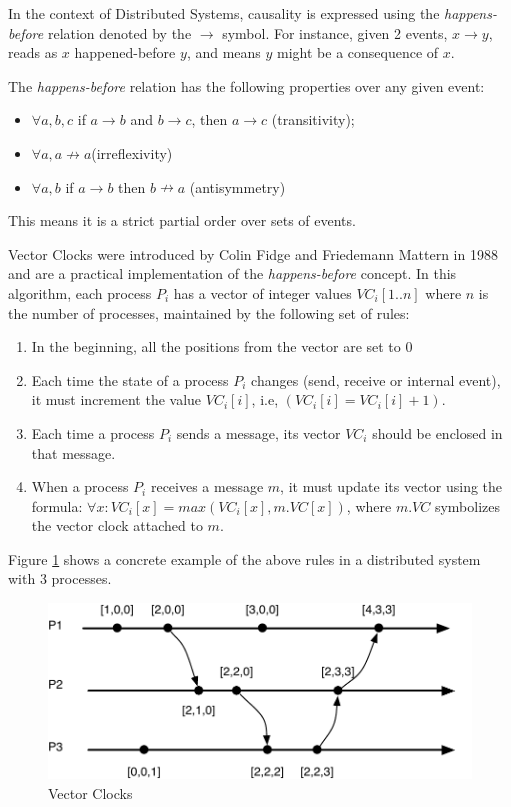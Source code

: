 In the context of Distributed Systems, causality is expressed using the
\textit{happens-before} relation \cite{Lamport:1978} denoted by the
$\rightarrow$ symbol. For instance, given 2 events, $x \rightarrow y$, reads
as $x$ happened-before $y$, and means $y$ might be a consequence of
$x$.

The \textit{happens-before} relation has the following properties over any given event:
\begin{itemize}
\item $\forall a,b,c$ if $a \rightarrow b$ and $b\rightarrow c$, then $a
  \rightarrow c$ (transitivity);
\item $\forall a, a \nrightarrow a$(irreflexivity)
\item $\forall a,b$ if $a \rightarrow b$ then $b \nrightarrow a$ (antisymmetry)
\end{itemize}

This means it is a  strict partial order over
sets of events.

Vector Clocks were introduced by Colin Fidge \cite{Fidge} and Friedemann Mattern
\cite{Mattern} in 1988 and are a practical implementation of the
\textit{happens-before} concept.
In this algorithm, each process $P_i$ has a vector of integer values
$VC_i[1..n]$ where $n$ is the number of processes, maintained by the following
set of rules:
\begin{enumerate}
\item In the beginning, all the positions from the vector are set to 0
\item Each time the state of a process $P_i$ changes (send, receive or
  internal event), it must increment
  the value $VC_i[i]$, i.e, $(VC_i[i] = VC_i[i]+1)$.
\item Each time a process $P_i$ sends a message, its vector $VC_i$
  should be enclosed in that message.
\item When a process $P_i$ receives a message $m$, it must update its
  vector using the formula: $\forall x:VC_i[x] = max(VC_i[x],m.VC[x])$,
  where $m.VC$ symbolizes the vector clock attached to $m$.
\end{enumerate}

Figure \ref{fig:vector_clocks} shows a concrete example of the above
rules in a distributed system with 3 processes.

\begin{figure}[htb]
  \centering
  \includegraphics[width=\textwidth]{images/vector_clocks.pdf}
  \caption{ Vector Clocks}
  \label{fig:vector_clocks}
\end{figure}

